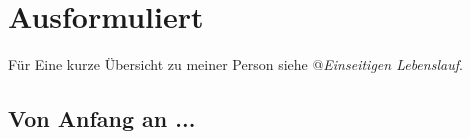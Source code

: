 \documentclass{scrartcl}
\begin{document}
\newpage


\section*{Ausformuliert}
Für Eine kurze Übersicht zu meiner Person siehe @{\em Einseitigen Lebenslauf}.


\subsection*{Von Anfang an ...}


%
\end{document}
